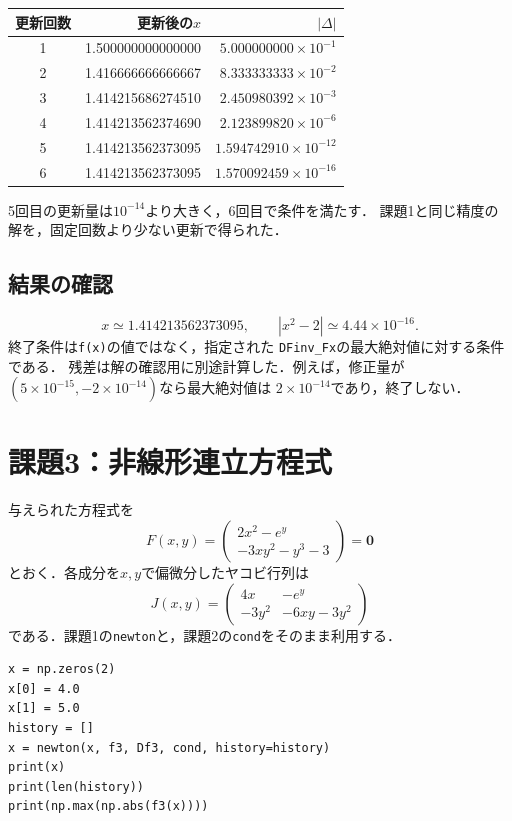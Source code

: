 \documentclass[a4paper,10pt]{article}
\begin{document}
\begin{center}
\begin{tabular}{crr}
\toprule
更新回数 & 更新後の$x$ & $|\Delta|$\\
\midrule
1 & 1.500000000000000 & $5.000000000\times10^{-1}$\\
2 & 1.416666666666667 & $8.333333333\times10^{-2}$\\
3 & 1.414215686274510 & $2.450980392\times10^{-3}$\\
4 & 1.414213562374690 & $2.123899820\times10^{-6}$\\
5 & 1.414213562373095 & $1.594742910\times10^{-12}$\\
6 & 1.414213562373095 & $1.570092459\times10^{-16}$\\
\bottomrule
\end{tabular}
\end{center}
5回目の更新量は$10^{-14}$より大きく，6回目で条件を満たす．
課題1と同じ精度の解を，固定回数より少ない更新で得られた．

\subsection*{結果の確認}
\[
  x\simeq1.414213562373095,\qquad
  |x^2-2|\simeq4.44\times10^{-16}.
\]
終了条件は\texttt{f(x)}の値ではなく，指定された
\texttt{DFinv\_Fx}の最大絶対値に対する条件である．
残差は解の確認用に別途計算した．例えば，修正量が
$(5\times10^{-15},-2\times10^{-14})$なら最大絶対値は
$2\times10^{-14}$であり，終了しない．

\newpage
\section*{課題3：非線形連立方程式}
与えられた方程式を
\[
 F(x,y)=
 \begin{pmatrix}
  2x^2-e^y\\
  -3xy^2-y^3-3
 \end{pmatrix}
 =\boldsymbol{0}
\]
とおく．各成分を$x,y$で偏微分したヤコビ行列は
\[
 J(x,y)=
 \begin{pmatrix}
  4x & -e^y\\
  -3y^2 & -6xy-3y^2
 \end{pmatrix}
\]
である．課題1の\texttt{newton}と，課題2の\texttt{cond}をそのまま利用する．


\begin{lstlisting}
x = np.zeros(2)
x[0] = 4.0
x[1] = 5.0
history = []
x = newton(x, f3, Df3, cond, history=history)
print(x)
print(len(history))
print(np.max(np.abs(f3(x))))
\end{lstlisting}
\end{document}
